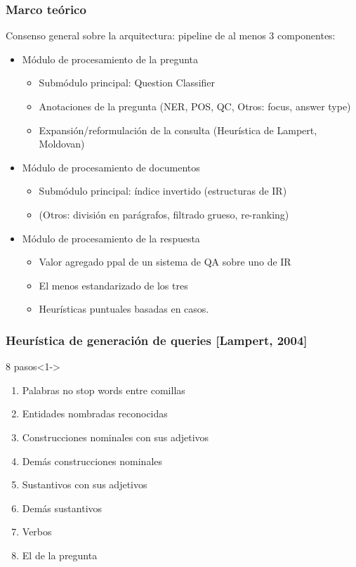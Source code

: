 \begin{frame}
\frametitle{Marco teórico}
  Consenso general sobre la arquitectura: pipeline de al menos 3 componentes:
  \begin{itemize}
    \item Módulo de procesamiento de la pregunta
    \begin{itemize}
      \item Submódulo principal: Question Classifier
      \item Anotaciones de la pregunta (NER, POS, QC, Otros: focus, answer type)
      \item Expansión/reformulación de la consulta (Heurística de Lampert, Moldovan)
    \end{itemize}
    \item Módulo de procesamiento de documentos
    \begin{itemize}
      \item Submódulo principal: índice invertido (estructuras de IR)
      \item (Otros: división en parágrafos, filtrado grueso, re-ranking)
    \end{itemize}
    \item Módulo de procesamiento de la respuesta
    \begin{itemize}
      \item Valor agregado ppal de un sistema de QA sobre uno de IR
      \item El menos estandarizado de los tres
      \item Heurísticas puntuales basadas en casos.
    \end{itemize}
  \end{itemize}

\end{frame}

\begin{frame}
\frametitle{Heurística de generación de queries [Lampert, 2004]}
\begin{block}{8 pasos}<1->
\begin{enumerate}
\item Palabras no stop words entre comillas
\item Entidades nombradas reconocidas
\item Construcciones nominales con sus adjetivos
\item Demás construcciones nominales
\item Sustantivos con sus adjetivos
\item Demás sustantivos
\item Verbos
\item El  de la pregunta
\end{enumerate}
\end{block}
\end{frame}

